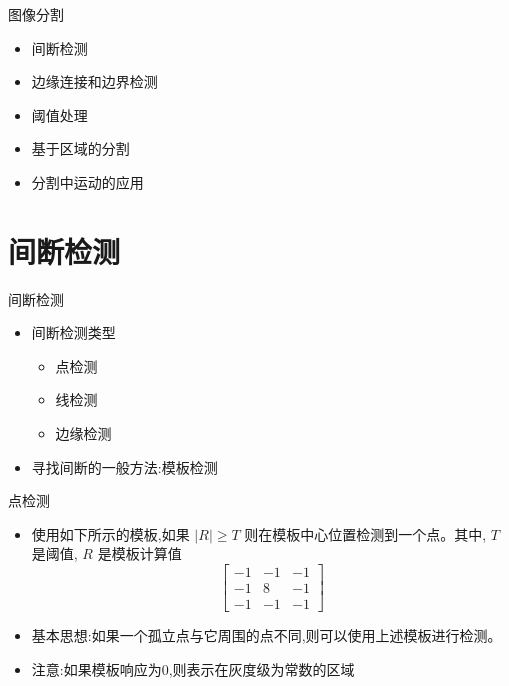 \documentclass[presentation]{beamer}
\begin{document}
\begin{frame}[label={sec:org0c3601f}]{图像分割}
\begin{itemize}
\item 间断检测
\item 边缘连接和边界检测
\item 阈值处理
\item 基于区域的分割
\item 分割中运动的应用
\end{itemize}
\end{frame}

\section{间断检测}
\label{sec:org0525946}
\begin{frame}[label={sec:orgfe0a1d1}]{间断检测}
\begin{itemize}
\item 间断检测类型
\begin{itemize}
\item 点检测
\item 线检测
\item 边缘检测
\end{itemize}
\item 寻找间断的一般方法:模板检测
\end{itemize}
\end{frame}

\begin{frame}[label={sec:orga10adcb}]{点检测}
\begin{itemize}
\item 使用如下所示的模板,如果 \(|R|\geq T\) 则在模板中心位置检测到一个点。其中, \(T\) 是阈值, \(R\) 是模板计算值
\[\begin{bmatrix}
           -1 & -1 & -1 \\
           -1 &  8 & -1 \\
           -1 & -1 & -1 \end{bmatrix}\]
\item 基本思想:如果一个孤立点与它周围的点不同,则可以使用上述模板进行检测。
\item 注意:如果模板响应为0,则表示在灰度级为常数的区域
\end{itemize}
\end{frame}
\end{document}
